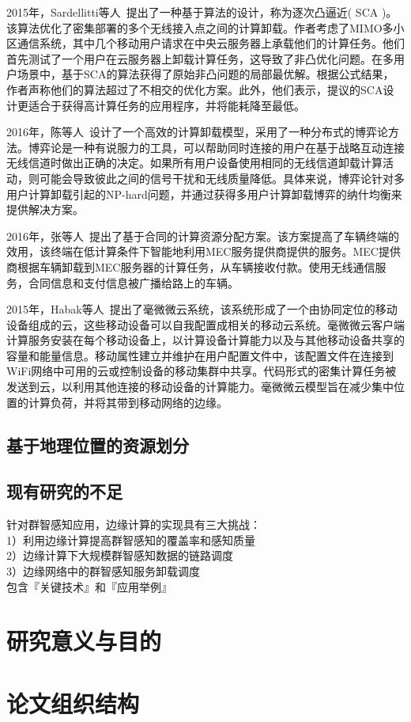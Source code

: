 2015年，Sardellitti等人~\cite{DBLP:journals/tsipn/SardellittiSB15}提出了一种基于算法的设计，称为逐次凸逼近( SCA )。该算法优化了密集部署的多个无线接入点之间的计算卸载。作者考虑了MIMO多小区通信系统，其中几个移动用户请求在中央云服务器上承载他们的计算任务。他们首先测试了一个用户在云服务器上卸载计算任务，这导致了非凸优化问题。在多用户场景中，基于SCA的算法获得了原始非凸问题的局部最优解。根据公式结果，作者声称他们的算法超过了不相交的优化方案。此外，他们表示，提议的SCA设计更适合于获得高计算任务的应用程序，并将能耗降至最低。

2016年，陈等人~\cite{DBLP:journals/ton/ChenJLF16}设计了一个高效的计算卸载模型，采用了一种分布式的博弈论方法。博弈论是一种有说服力的工具，可以帮助同时连接的用户在基于战略互动连接无线信道时做出正确的决定。如果所有用户设备使用相同的无线信道卸载计算活动，则可能会导致彼此之间的信号干扰和无线质量降低。具体来说，博弈论针对多用户计算卸载引起的NP-hard问题，并通过获得多用户计算卸载博弈的纳什均衡来提供解决方案。

2016年，张等人~\cite{DBLP:conf/rndm/ZhangMLV016}提出了基于合同的计算资源分配方案。该方案提高了车辆终端的效用，该终端在低计算条件下智能地利用MEC服务提供商提供的服务。MEC提供商根据车辆卸载到MEC服务器的计算任务，从车辆接收付款。使用无线通信服务，合同信息和支付信息被广播给路上的车辆。

2015年，Habak等人~\cite{DBLP:conf/IEEEcloud/HabakAHZ15}提出了毫微微云系统，该系统形成了一个由协同定位的移动设备组成的云，这些移动设备可以自我配置成相关的移动云系统。毫微微云客户端计算服务安装在每个移动设备上，以计算设备计算能力以及与其他移动设备共享的容量和能量信息。移动属性建立并维护在用户配置文件中，该配置文件在连接到WiFi网络中可用的云或控制设备的移动集群中共享。代码形式的密集计算任务被发送到云，以利用其他连接的移动设备的计算能力。毫微微云模型旨在减少集中位置的计算负荷，并将其带到移动网络的边缘。

\subsection{基于地理位置的资源划分}



\subsection{现有研究的不足}

针对群智感知应用，边缘计算的实现具有三大挑战：\\
1）利用边缘计算提高群智感知的覆盖率和感知质量\\
2）边缘计算下大规模群智感知数据的链路调度\\
3）边缘网络中的群智感知服务卸载调度\\

包含『关键技术』和『应用举例』

\section{研究意义与目的}

\section{论文组织结构}
